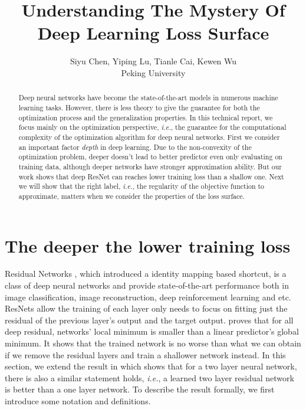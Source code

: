 \documentclass{article}
\title{Understanding The Mystery Of Deep Learning Loss Surface}
\author{
	Siyu Chen, Yiping Lu, Tianle Cai, Kewen Wu\\
Peking University
}
\theoremstyle{plain}
\theoremstyle{definition}
\begin{document}

\maketitle

\begin{abstract}
Deep neural networks have become the state-of-the-art
models in numerous machine learning
tasks. However, there is less theory to give the guarantee for both the optimization process and the generalization properties. In this technical report, we focus mainly on the optimization perspective, \emph{i.e.}, the guarantee for the computational complexity of the optimization algorithm for deep neural networks. First we consider an important factor \emph{depth} in deep learning. Due to the non-convexity of the optimization problem, deeper doesn't lead to better predictor even only evaluating on training data, although deeper networks have stronger approximation ability. But our work shows that deep ResNet can reaches lower training loss than a shallow one. Next we will show that the right label, \emph{i.e.}, the regularity of the objective function to approximate, matters when we consider the properties of the loss surface.

\end{abstract}

\section{The deeper the lower training loss}

Residual Networks \cite{he2016deep,he2016identity}, which introduced a identity mapping based shortcut, is a class of deep neural networks and provide state-of-the-art performance both in image classification\cite{he2016deep,he2016identity}, image reconstruction\cite{he2016deep}, deep reinforcement learning\cite{silver2017mastering} and etc. ResNets allow the training of each layer only needs to focus on fitting just the residual of the previous layer’s output and the target output. \cite{2018arXiv180406739S} proves that for all deep residual, networks' local minimum is smaller than a linear predictor's global minimum. It shows that the trained network is no worse than what we can obtain if we remove the
residual layers and train a shallower network instead. In this section, we extend the result in \cite{2018arXiv180406739S} which shows that for a two layer neural network, there is also a similar statement holds, \emph{i.e.}, a learned two layer residual network is better than a one layer network. To describe the result formally, we first introduce some notation and definitions.
\end{document}
